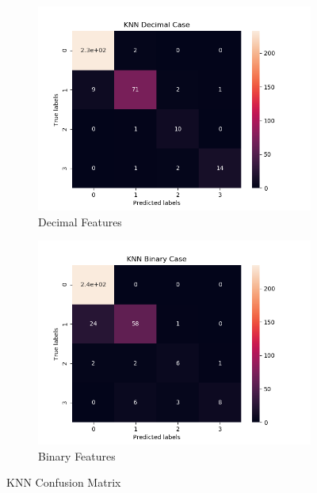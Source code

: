 \begin{figure}[H]
     \centering
     \hspace*{\fill}
     \begin{subfigure}[b]{0.35\textwidth}
         \centering
         \includegraphics[width=\textwidth]{../Figures/KNN Decimal Case_conf_mat.png}
         \caption{Decimal Features}
     \end{subfigure}
     \hfill
     \begin{subfigure}[b]{0.35\textwidth}
         \centering
         \includegraphics[width=\textwidth]{../Figures/KNN Binary Case_conf_mat.png}
         \caption{Binary Features}
     \end{subfigure}
     \hspace*{\fill}
     \caption{KNN Confusion Matrix}
\end{figure}

